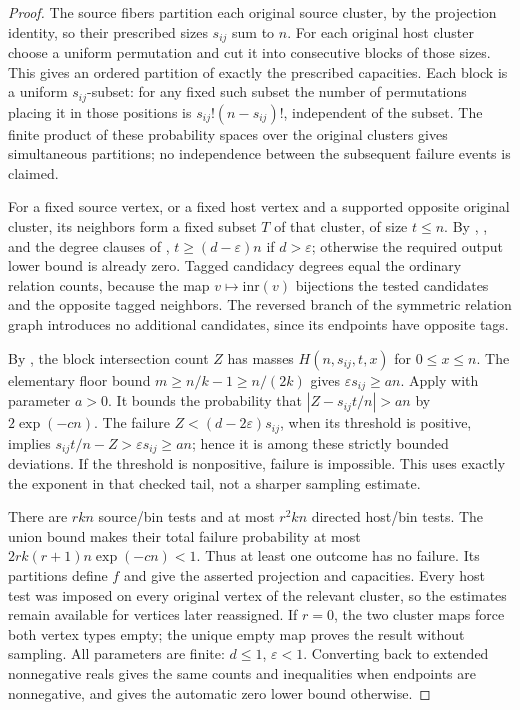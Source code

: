 \begin{proof}
The source fibers partition each original source cluster, by the
projection identity, so their prescribed sizes $s_{ij}$ sum to $n$.
For each original host cluster choose a uniform permutation and cut
it into consecutive blocks of those sizes. This gives an ordered
partition of exactly the prescribed capacities. Each block is a
uniform $s_{ij}$-subset: for any fixed such subset the number of
permutations placing it in those positions is $s_{ij}!(n-s_{ij})!$,
independent of the subset. The finite product of these probability
spaces over the original clusters gives simultaneous partitions;
no independence between the subsequent failure events is claimed.

For a fixed source vertex, or a fixed host vertex and a supported
opposite original cluster, its neighbors form a fixed subset $T$
of that cluster, of size $t\leq n$. By
, ,
and the degree clauses of ,
$t\geq(d-\varepsilon)n$ if $d>\varepsilon$; otherwise the required
output lower bound is already zero. Tagged candidacy degrees equal
the ordinary relation counts, because the map $v\mapsto\mathrm{inr}(v)$
bijections the tested candidates and the opposite tagged neighbors.
The reversed branch of the symmetric relation graph introduces no
additional candidates, since its endpoints have opposite tags.

By , the block intersection
count $Z$ has masses $H(n,s_{ij},t,x)$ for $0\leq x\leq n$.
The elementary floor bound $m\geq n/k-1\geq n/(2k)$ gives
$\varepsilon s_{ij}\geq an$. Apply
 with parameter $a>0$.
It bounds the probability that $|Z-s_{ij}t/n|>an$ by
$2\exp(-cn)$. The failure $Z<(d-2\varepsilon)s_{ij}$,
when its threshold is positive, implies
$s_{ij}t/n-Z>\varepsilon s_{ij}\geq an$; hence it is among
these strictly bounded deviations. If the threshold is nonpositive,
failure is impossible. This uses exactly the exponent in that
checked tail, not a sharper sampling estimate.

There are $rkn$ source/bin tests and at most $r^2kn$ directed
host/bin tests. The union bound makes their total failure
probability at most $2rk(r+1)n\exp(-cn)<1$.
Thus at least one outcome has no failure. Its partitions define
$f$ and give the asserted projection and capacities. Every host
test was imposed on every original vertex of the relevant cluster,
so the estimates remain available for vertices later reassigned.
If $r=0$, the two cluster maps force both vertex types empty; the
unique empty map proves the result without sampling.
All parameters are finite: $d\leq1$, $\varepsilon<1$.
Converting back to extended nonnegative reals gives the same counts
and inequalities when endpoints are nonnegative, and gives the
automatic zero lower bound otherwise.
\end{proof}
